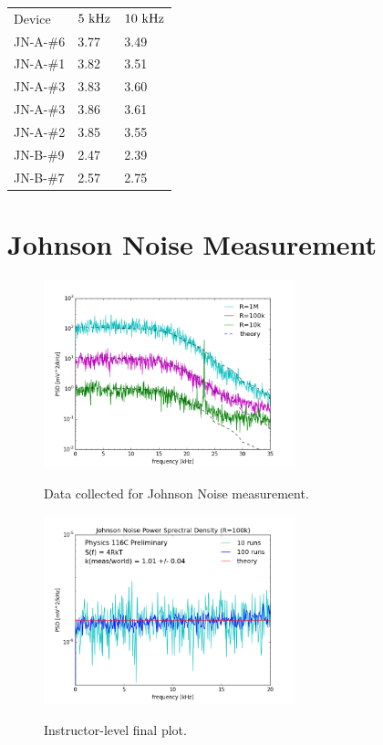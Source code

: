 \documentclass[12pt]{article}
\begin{document}
\begin{tabular}{lll}
Device & $5~\rm kHz$ & $10~\rm kHz$ \\ 
JN-A-\#6 & 3.77 & 3.49 \\
JN-A-\#1 & 3.82 & 3.51 \\
JN-A-\#3 & 3.83 & 3.60 \\
JN-A-\#3 & 3.86 & 3.61 \\
JN-A-\#2 & 3.85 & 3.55 \\
JN-B-\#9 & 2.47 & 2.39 \\
JN-B-\#7 & 2.57 & 2.75 \\

\end{tabular}

\section{Johnson Noise Measurement}

\begin{figure}[htbp]
\begin{center}
{\includegraphics[width=0.65\textwidth]{figs/compare_psd.png}}
\end{center}
\caption{\label{fig:compare_psd}  Data collected for Johnson Noise measurement.}\end{figure}


\begin{figure}[htbp]
\begin{center}
{\includegraphics[width=0.65\textwidth]{figs/noise.png}}
\end{center}
\caption{\label{fig:noise}  Instructor-level final plot.}\end{figure}
\end{document}
